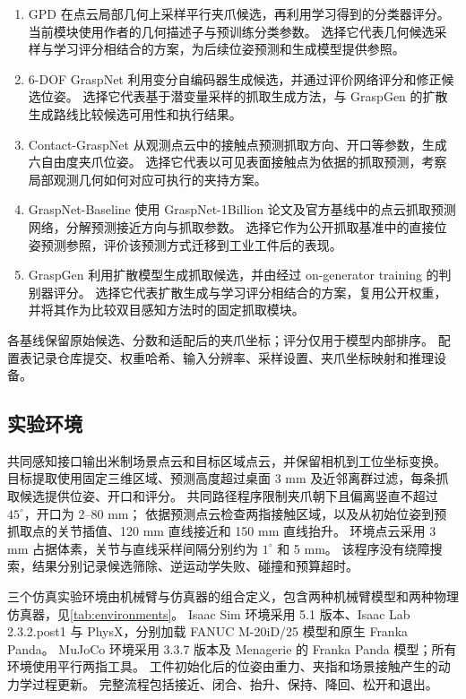 \documentclass[UTF8,fontset=fandol,a4paper,11pt]{ctexart}
\newcommand{\qyb}[1]{\textcolor{red!75!black}{#1}}
\begin{document}
\begin{enumerate}
\item GPD 在点云局部几何上采样平行夹爪候选，再利用学习得到的分类器评分\cite{tenpas2017}。
当前模块使用作者的几何描述子与预训练分类参数。
选择它代表几何候选采样与学习评分相结合的方案，为后续位姿预测和生成模型提供参照。
\item 6-DOF GraspNet 利用变分自编码器生成候选，并通过评价网络评分和修正候选位姿\cite{mousavian2019}。
选择它代表基于潜变量采样的抓取生成方法，与 GraspGen 的扩散生成路线比较候选可用性和执行结果。
\item Contact-GraspNet 从观测点云中的接触点预测抓取方向、开口等参数，生成六自由度夹爪位姿\cite{sundermeyer2021}。
选择它代表以可见表面接触点为依据的抓取预测，考察局部观测几何如何对应可执行的夹持方案。
\item GraspNet-Baseline 使用 GraspNet-1Billion 论文及官方基线中的点云抓取预测网络，分解预测接近方向与抓取参数\cite{fang2020}。
选择它作为公开抓取基准中的直接位姿预测参照，评价该预测方式迁移到工业工件后的表现。
\item GraspGen 利用扩散模型生成抓取候选，并由经过 on-generator training 的判别器评分\cite{murali2026}。
选择它代表扩散生成与学习评分相结合的方案，复用公开权重，并将其作为比较双目感知方法时的固定抓取模块。
\end{enumerate}

各基线保留原始候选、分数和适配后的夹爪坐标；评分仅用于模型内部排序。
配置表记录仓库提交、权重哈希、输入分辨率、采样设置、夹爪坐标映射和推理设备。

\subsection{\qyb{实验环境}}

共同感知接口输出米制场景点云和目标区域点云，并保留相机到工位坐标变换。
目标提取使用固定三维区域、预测高度超过桌面 3 mm 及近邻离群过滤，每条抓取候选提供位姿、开口和评分。
共同路径程序限制夹爪朝下且偏离竖直不超过 $45^\circ$，开口为 2--80 mm；
依据预测点云检查两指接触区域，以及从初始位姿到预抓取点的关节插值、120 mm 直线接近和 150 mm 直线抬升。
环境点云采用 3 mm 占据体素，关节与直线采样间隔分别约为 $1^\circ$ 和 5 mm。
该程序没有绕障搜索，结果分别记录候选筛除、逆运动学失败、碰撞和预算超时。

三个仿真实验环境由机械臂与仿真器的组合定义，包含两种机械臂模型和两种物理仿真器，见\cref{tab:environments}。
Isaac Sim 环境采用 5.1 版本、Isaac Lab 2.3.2.post1 与 PhysX，分别加载 FANUC M-20iD/25 模型和原生 Franka Panda。
MuJoCo 环境采用 3.3.7 版本及 Menagerie 的 Franka Panda 模型；所有环境使用平行两指工具。
工件初始化后的位姿由重力、夹指和场景接触产生的动力学过程更新。
完整流程包括接近、闭合、抬升、保持、降回、松开和退出。
\end{document}
